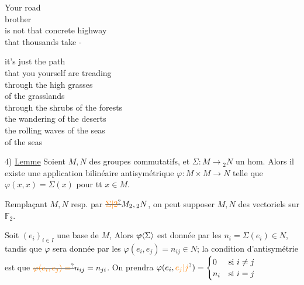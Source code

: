 \begin{minipage}[t]{.48\linewidth}\small\raggedright
Your road\\
brother\\
is not that concrete highway\\
that thousands take -

\smallskip
it's just the path\\
that you yourself are treading\\
through the high grasses\\
of the grasslands\\
through the shrubs of the forests\\
the wandering  of the deserts\\
the rolling waves of the seas\\
of the seas
\end{minipage}\par
4) \uline{Lemme} Soient $M,N$ des groupes commutatifs, et $\Sigma\colon M\longrightarrow {}_2N$ un hom. Alors il existe une application bilinéaire antisymétrique $\varphi\colon M\times M\longrightarrow N$ telle que $\varphi(x,x)=\Sigma(x)$ pour tt $x\in M$.

Remplaçant $M,N$ resp. par $\deleted{\unsure{\Sigma|2}}M_2,{}_2N$, on peut supposer $M,N$ des vectoriels  sur $\mathbb F_2$.

Soit $(e_i)_{i\in I}$ une base de $M$,  Alors $\deleted{\varphi}\inserted{\Sigma}$ est donnée par les $n_i=\Sigma(e_i)\in N$, tandis que $\varphi$ sera donnée par les $\varphi(e_i,e_j)=n_{ij}\in N$; la condition d'antisymétrie  est que $\deleted{\unsure{\varphi(e_i,e_j)=}} n_{ij}=n_{ji}$. On prendra $\varphi(e_i,\unsure{e_j|j})=\begin{cases}0&\text{si }i\ne j\\ n_i&\text{si }i=j\end{cases}$ 


